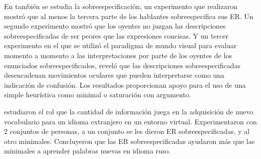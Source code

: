 En \cite{do-speakers} tambi\'en se estudia la sobreespecificaci\'on, un experimento que realizaron mostr\'o que al menos la tercera parte de los hablantes sobreespecifica sus ER. Un segundo experimento mostr\'o que los oyentes no juzgan las descripciones sobreespecificadas de ser peores que las expresiones concisas. Y un tercer experimento en el que se utiliz\'o el paradigma de mundo visual para evaluar momento a momento a las interpretaciones por parte de los oyentes de los enunciados sobreespecificados, revel\'o que las descripciones sobreespecificadas desencadenan movimientos oculares que pueden interpretarse como una indicaci\'on de confusi\'on. Los resultados proporcionan apoyo para el uso de una simple heur\'istica como minimal o saturaci\'on con argumento.


\cite{Lu_sasha2015} estudiaron el rol que la cantidad de informaci\'on juega en la adquisici\'on de nuevo vocabulario para un idioma extranjero en un entorno virtual. Experimentaron con 2 conjuntos de personas, a un conjunto se les dieron ER sobreespecificadas, y al otro minimales. Concluyeron que las ER sobreespecificadas ayudaron m\'as que las minimales a aprender palabras nuevas en idioma ruso.

